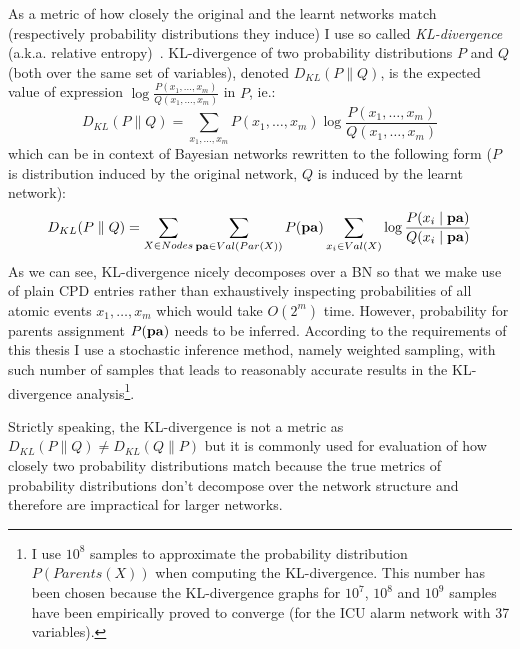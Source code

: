 \documentclass[english,cover]{fitthesis} %
\newcommand{\term}[1]{\emph{#1}}           %
\newcommand{\vars}[1]{{\bold{#1}}}         %
\begin{document}
As a metric of how closely the original and the learnt networks match (respectively probability distributions they induce) I use so called \term{KL-divergence} (a.k.a. relative entropy)~\cite{pgm}. KL-divergence of two probability distributions $P$ and $Q$ (both over the same set of variables), denoted $D_{KL}(P \parallel Q)$, is the expected value of expression $\log \frac{P(x_1,\dots,x_m)}{Q(x_1,\dots,x_m)}$ in $P$, ie.:
\begin{equation*}
D_{KL}(P \parallel Q) = \sum_{x_1,\dots,x_m} P(x_1,\dots,x_m) \log \frac{P(x_1,\dots,x_m)}{Q(x_1,\dots,x_m)}
\end{equation*}
which can be in context of Bayesian networks rewritten to the following form ($P$ is distribution induced by the original network, $Q$ is induced by the learnt network):
\begin{equation*}
D_{KL}(P \parallel Q) = \sum_{X \in Nodes} \sum_{\vars{pa} \in Val(Par(X))} P(\vars{pa}) \sum_{x_i \in Val(X)} \log \frac{P(x_i \mid \vars{pa})}{Q(x_i \mid \vars{pa})}
\end{equation*}
As we can see, KL-divergence nicely decomposes over a BN so that we make use of plain CPD entries rather than exhaustively inspecting probabilities of all atomic events $x_1, \dots, x_m$ which would take $O(2^m)$ time. However, probability for parents assignment $P(\vars{pa})$ needs to be inferred. According to the requirements of this thesis I use a stochastic inference method, namely weighted sampling, with such number of samples that leads to reasonably accurate results in the KL-divergence analysis\footnote{I use $10^8$ samples to approximate the probability distribution $P(Parents(X))$ when computing the KL-divergence. This number has been chosen because the KL-divergence graphs for $10^7$, $10^8$ and $10^9$ samples have been empirically proved to converge (for the ICU alarm network with 37 variables).}.

Strictly speaking, the KL-divergence is not a metric as $D_{KL}(P \parallel Q) \neq D_{KL}(Q \parallel P)$ but it is commonly used for evaluation of how closely two probability distributions match because the true metrics of probability distributions don't decompose over the network structure and therefore are impractical for larger networks.
\end{document}
